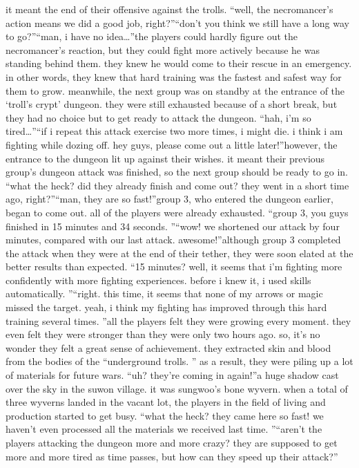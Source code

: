 it meant the end of their offensive against the trolls.
“well, the necromancer’s action means we did a good job, right?”“don’t you think we still have a long way to go?”“man, i have no idea…”the players could hardly figure out the necromancer’s reaction, but they could fight more actively because he was standing behind them.
 they knew he would come to their rescue in an emergency.
in other words, they knew that hard training was the fastest and safest way for them to grow.
meanwhile, the next group was on standby at the entrance of the ‘troll’s crypt’ dungeon.
they were still exhausted because of a short break, but they had no choice but to get ready to attack the dungeon.
“hah, i’m so tired…”“if i repeat this attack exercise two more times, i might die.
 i think i am fighting while dozing off.
 hey guys, please come out a little later!”however, the entrance to the dungeon lit up against their wishes.
 it meant their previous group’s dungeon attack was finished, so the next group should be ready to go in.
“what the heck? did they already finish and come out? they went in a short time ago, right?”“man, they are so fast!”group 3, who entered the dungeon earlier, began to come out.
 all of the players were already exhausted.
“group 3, you guys finished in 15 minutes and 34 seconds.
”“wow! we shortened our attack by four minutes, compared with our last attack.
 awesome!”although group 3 completed the attack when they were at the end of their tether, they were soon elated at the better results than expected.
“15 minutes? well, it seems that i’m fighting more confidently with more fighting experiences.
 before i knew it, i used skills automatically.
”“right.
 this time, it seems that none of my arrows or magic missed the target.
 yeah, i think my fighting has improved through this hard training several times.
”all the players felt they were growing every moment.
 they even felt they were stronger than they were only two hours ago.
 so, it’s no wonder they felt a great sense of achievement.
they extracted skin and blood from the bodies of the “underground trolls.
” as a result, they were piling up a lot of materials for future wars.
“uh? they’re coming in again!”a huge shadow cast over the sky in the suwon village.
 it was sungwoo’s bone wyvern.
when a total of three wyverns landed in the vacant lot, the players in the field of living and production started to get busy.
“what the heck? they came here so fast! we haven’t even processed all the materials we received last time.
”“aren’t the players attacking the dungeon more and more crazy? they are supposed to get more and more tired as time passes, but how can they speed up their attack?”

